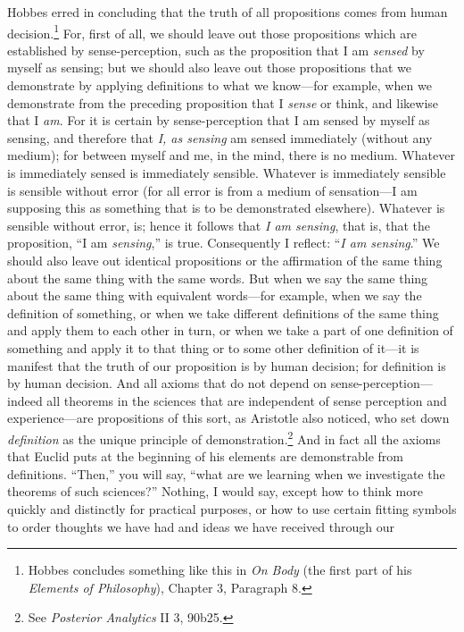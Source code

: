 \documentclass[twoside,openright]{article}
\begin{document}
Hobbes erred in concluding that the truth of all propositions comes from human
decision.\footnote{Hobbes concludes something like this in {\em On Body} (the first part of his {\em Elements of Philosophy}), Chapter 3, Paragraph 8. } For, first of all, we should leave out those propositions which are
established by sense-perception, such as the proposition that I am {\em
sensed} by myself as sensing; but we should also leave out those propositions
that we demonstrate by applying definitions to what we know---for example,
when we demonstrate from the preceding proposition that I {\em sense} or
think, and likewise that I {\em am}.  For it is certain by sense-perception
that I am sensed by myself as sensing, and therefore that {\em I, as sensing}
am sensed immediately (without any medium); for between myself and me, in the
mind, there is no medium.  Whatever is immediately sensed is immediately
sensible.  Whatever is immediately sensible is sensible without error (for all
error is from a medium of sensation---I am supposing this as something that
is to be demonstrated elsewhere).  Whatever is sensible without error, is;
hence it follows that {\em I am sensing}, that is, that the proposition, ``I
am {\em sensing},'' is true.  Consequently I reflect: ``{\em I am sensing}.''
We should also leave out identical propositions or the affirmation of the same
thing about the same thing with the same words. But when we say the same thing
about the same thing with equivalent words---for example, when we say the
definition of something, or when we take different definitions of the same
thing and apply them to each other in turn, or when we take a part of one
definition of something and apply it to that thing or to some other definition
of it---it is manifest that the truth of our proposition is by human
decision; for definition is by human decision.  And all axioms that do not
depend on sense-perception---indeed all theorems in the sciences that are
independent of sense perception and experience---are propositions of this
sort, as Aristotle also noticed, who set down {\em definition} as the unique
principle of demonstration.\footnote{See {\em Posterior Analytics} II 3, 90b25.}  And in fact all the axioms that Euclid puts at
the beginning of his elements are demonstrable from definitions.  ``Then,''
you will say, ``what are we learning when we investigate the theorems of such
sciences?''  Nothing, I would say, except how to think more quickly and
distinctly for practical purposes, or how to use certain fitting symbols to
order thoughts we have had and ideas we have received through our
\end{document}
